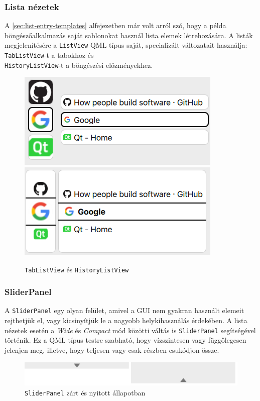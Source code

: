 \documentclass[12pt]{report}
\begin{document}
\subsubsection{Lista nézetek}
A \ref{sec:list-entry-templates} alfejezetben már volt arról szó, hogy a példa
böngészőalkalmazás saját sablonokat használ lista elemek létrehozására. A listák
megjelenítésére a \texttt{ListView} QML típus saját, specializált változatait használja:
\texttt{TabListView}-t a tabokhoz és \\
\texttt{HistoryListView}-t a böngészési előzményekhez.
\begin{figure}[H]
    \centering
    \includegraphics[scale=0.5]{TabListView}
    \includegraphics[scale=0.5]{HistoryListView}
    \caption{
        \label{fig:tab-list-view}
        \texttt{TabListView} és \texttt{HistoryListView}
    }
\end{figure}

\subsubsection{SliderPanel}
A \texttt{SliderPanel} egy olyan felület, amivel a GUI nem gyakran használt elemeit rejthetjük
el, vagy kicsinyítjük le a nagyobb helykihasználás érdekében. A lista nézetek esetén a
\textit{Wide} és \textit{Compact} mód közötti váltás is \texttt{SliderPanel} segítségével
történik. Ez a QML típus testre szabható, hogy vízszintesen vagy függőlegesen jelenjen meg,
illetve, hogy teljesen vagy csak részben csukódjon össze.
\begin{figure}[H]
    \centering
    \includegraphics[scale=0.8]{SliderPanel}
    \caption{
        \label{fig:slider-panel}
        \texttt{SliderPanel} zárt és nyitott állapotban
    }
\end{figure}
\end{document}
